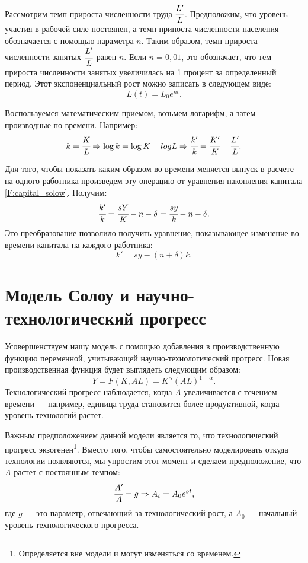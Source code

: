 Рассмотрим темп прироста численности труда $\cfrac{L'}{L}$.
Предположим, что уровень участия в рабочей силе постоянен, а темп припоста численности населения обозначается с помощью параметра $n$.
Таким образом, темп прироста численности занятых $\cfrac{L'}{L}$ равен $n$.
Если $n = 0,01$, это обозначает, что тем прироста численности занятых увеличилась на 1 процент за определенный период.
Этот экспоненциальный рост можно записать в следующем виде:
\begin{equation*}
	L(t) = L_{0}e^{nt}\text{.}
\end{equation*}

Воспользуемся математическим приемом, возьмем логарифм, а затем производные по времени.
Например:
\begin{equation*}
	k = \cfrac{K}{L}\Rightarrow \log{k}=\log{K} - log{L} \Rightarrow \cfrac{k'}{k} = \cfrac{K'}{K} - \cfrac{L'}{L}\text{.}
\end{equation*}

Для того, чтобы показать каким образом во времени меняется выпуск в расчете на одного работника произведем эту операцию от уравнения накопления капитала \ref{F:capital_solow}.
Получим:
\begin{equation*}
\cfrac{k'}{k} = \cfrac{sY}{K} - n - \delta = \cfrac{sy}{k} - n - \delta\text{.}
\end{equation*}
Это преобразование позволило получить уравнение, показывающее изменение во времени капитала на каждого работника:
\begin{equation*}
k'=sy-(n + \delta)k\text{.}
\end{equation*}

\section{Модель Солоу и научно-технологический прогресс}

Усовершенствуем нашу модель с помощью добавления в производственную функцию переменной, учитывающей научно-технологический прогресс.
Новая производственная функция будет выглядеть следующим образом:
\begin{equation}
	Y=F(K,AL)=K^{\alpha}(AL)^{1 - \alpha}\text{.}
\label{F:Cob_dogl_tech}
\end{equation}
Технологический прогресс наблюдается, когда $A$ увеличивается с течением времени --- например, единица труда становится более продуктивной, когда уровень технологий растет.

Важным предположением данной модели является то, что технологический прогресс экзогенен\footnote{Определяется вне модели и могут изменяться со временем.}.
Вместо того, чтобы самостоятельно моделировать откуда технологии появляются, мы упростим этот момент и сделаем предположение, что $A$ растет с постоянным темпом:
\begin{equation*}
	\cfrac{A'}{A} = g \Rightarrow A_{t} = A_{0} e^{gt}\text{,}
\end{equation*}
где $g$ --- это параметр, отвечающий за технологический рост, а $A_0$ --- начальный уровень технологического прогресса.

